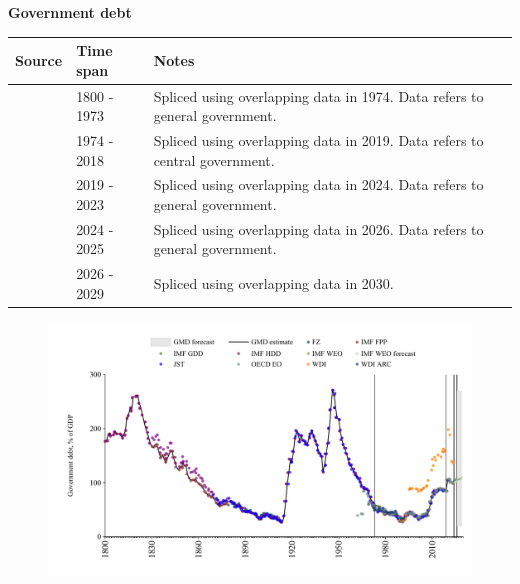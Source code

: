 \documentclass[12pt,a4paper,landscape]{article}
\begin{document}
\begin{adjustbox}{max totalsize={\paperwidth}{\paperheight},center}
\begin{minipage}[t][\textheight][t]{\textwidth}
\vspace*{0.5cm}
{}
\begin{center}
{\Large\bfseries Government debt}
\end{center}
\vspace{0.5cm}
\begin{table}[H]
\centering
\small
\begin{tabular}{|l|l|l|}
\hline
\textbf{Source} & \textbf{Time span} & \textbf{Notes} \\
\hline
\rowcolor{white}\cite{IMF_FPP}& 1800 - 1973 &Spliced using overlapping data in 1974. Data refers to general government.\\
\rowcolor{lightgray}\cite{IMF_GDD}& 1974 - 2018 &Spliced using overlapping data in 2019. Data refers to central government.\\
\rowcolor{white}\cite{IMF_FPP}& 2019 - 2023 &Spliced using overlapping data in 2024. Data refers to general government.\\
\rowcolor{lightgray}\cite{OECD_EO}& 2024 - 2025 &Spliced using overlapping data in 2026. Data refers to general government.\\
\rowcolor{white}\cite{IMF_WEO_forecast}& 2026 - 2029 &Spliced using overlapping data in 2030. \\
\hline
\end{tabular}
\end{table}
\begin{figure}[H]
\centering
\includegraphics[width=\textwidth,height=0.6\textheight,keepaspectratio]{graphs/GBR_govdebt_GDP.pdf}
\end{figure}
\end{minipage}
\end{adjustbox}
\end{document}
